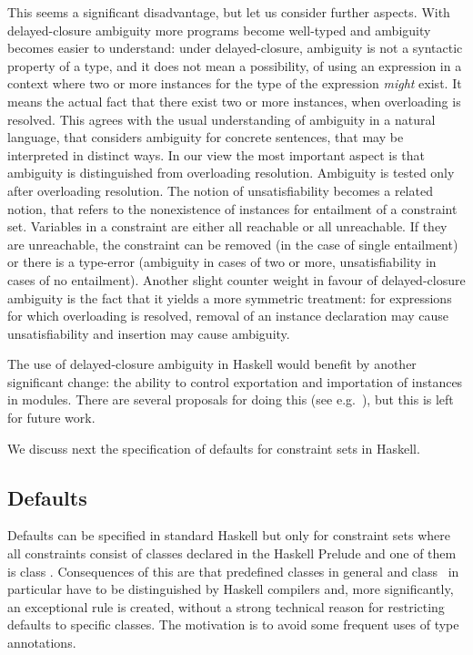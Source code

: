 \documentclass[review]{elsarticle}
\begin{document}
This seems a significant disadvantage, but let us consider further
aspects. With delayed-closure ambiguity more programs become
well-typed and ambiguity becomes easier to understand: under
delayed-closure, ambiguity is not a syntactic property of a type, and
it does not mean a possibility, of using an expression in a context
where two or more instances for the type of the expression {\em
  might\/} exist. It means the actual fact that there exist two or
more instances, when overloading is resolved. This agrees with the
usual understanding of ambiguity in a natural language, that considers
ambiguity for concrete sentences, that may be interpreted in distinct
ways. In our view the most important aspect is that ambiguity is
distinguished from overloading resolution. Ambiguity is tested only
after overloading resolution.  The notion of unsatisfiability becomes
a related notion, that refers to the nonexistence of instances for
entailment of a constraint set. Variables in a constraint are either
all reachable or all unreachable. If they are unreachable, the
constraint can be removed (in the case of single entailment) or there
is a type-error (ambiguity in cases of two or more, unsatisfiability
in cases of no entailment). Another slight counter weight in favour of
delayed-closure ambiguity is the fact that it yields a more symmetric
treatment: for expressions for which overloading is resolved, removal
of an instance declaration may cause unsatisfiability and insertion
may cause ambiguity.

The use of delayed-closure ambiguity in Haskell would benefit by
another significant change: the ability to control exportation and
importation of instances in modules. There are several proposals for
doing this (see
e.g.~\cite{Named-instances,Modular-type-classes,Controlling-scope-instances}),
but this is left for future work.

We discuss next the specification of defaults for constraint sets in
Haskell.


\subsection{Defaults}
\label{Defaults}

Defaults can be specified in standard Haskell but only for constraint
sets where all constraints consist of classes declared in the Haskell
Prelude and one of them is class \Num. Consequences of this are that
predefined classes in general and class \Num\ in particular have to be
distinguished by Haskell compilers and, more significantly, an
exceptional rule is created, without a strong technical reason for
restricting defaults to specific classes. The motivation is to avoid
some frequent uses of type annotations.
\end{document}
